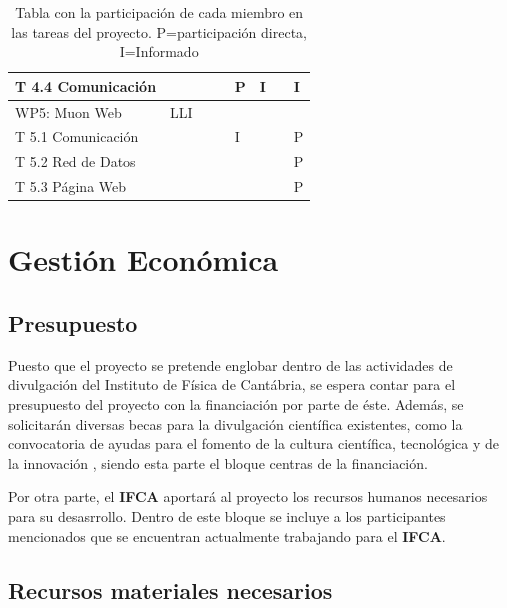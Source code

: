 \documentclass[11pt]{extarticle}
\begin{document}
\begin{table}[H]
\begin{tabular}{m{4.5cm} m{2.5cm} m{0.4cm} m{0.4cm} m{0.4cm} m{0.4cm} m{0.4cm} m{0.4cm}}
						    T 4.4 Comunicación 		& 		&	& 	& P	& I	&	& I \\ \hline
						    WP5: Muon Web 			& LLI 	&	& 	& 	& 	&	&   \\ \hline
						    T 5.1 Comunicación 		& 		&	& 	& I	& 	&	& P \\ \hline
						    T 5.2 Red de Datos 		& 		&	& 	& 	& 	&	& P \\ \hline
						    T 5.3 Página Web 		& 		&	& 	& 	& 	&	& P \\ \hline
					    \end{tabular}
					    \caption{\label{tab:Tareas} Tabla con la participación de cada miembro en las tareas del proyecto. P=participación directa, I=Informado}
					\end{table}

		\section{Gestión Económica}
			\label{Sec:}

			\subsection{Presupuesto}
				\label{SubSec:}

				Puesto que el proyecto se pretende englobar dentro de las actividades de divulgación del Instituto de Física de Cantábria, se espera contar para el presupuesto del proyecto con la financiación por parte de éste. Además, se solicitarán diversas becas para la divulgación científica existentes, como la convocatoria de ayudas para el fomento de la cultura científica, tecnológica y de la innovación \cite{FECYT}, siendo esta parte el bloque centras de la financiación.

				Por otra parte, el \textbf{IFCA} aportará al proyecto los recursos humanos necesarios para su desasrrollo. Dentro de este bloque se incluye a los participantes mencionados que se encuentran actualmente trabajando para el \textbf{IFCA}.

			\subsection{Recursos materiales necesarios}
				\label{SubSec:}
\end{document}
